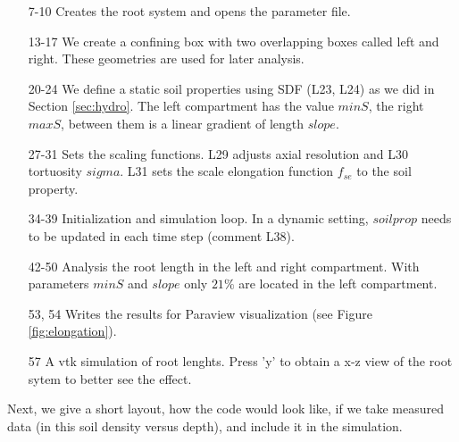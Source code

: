 \begin{itemize}

\item[7-10] Creates the root system and opens the parameter file.

\item[13-17] We create a confining box with two overlapping boxes called left and right. These geometries are used for later analysis.

\item[20-24] We define a static soil properties using SDF (L23, L24) as we did in Section \ref{sec:hydro}. 
The left compartment has the value $minS$, the right $maxS$, between them is a linear gradient of length $slope$.

\item[27-31] Sets the scaling functions. L29 adjusts axial resolution and L30 tortuosity $sigma$. L31 sets the scale elongation function $f_{se}$ to the soil property. 

\item[34-39] Initialization and simulation loop. In a dynamic setting, $soilprop$ needs to be updated in each time step (comment L38).

\item[42-50] Analysis the root length in the left and right compartment. With parameters $minS$ and $slope$ only $21\%$ are located in the left compartment.

\item[53, 54] Writes the results for Paraview visualization (see Figure \ref{fig:elongation}).

\item[57] A vtk simulation of root lenghts. Press 'y' to obtain a x-z view of the root sytem to better see the effect. 

\end{itemize}

Next, we give a short layout, how the code would look like, if we take measured data (in this soil density versus depth), and include it in the simulation. 




